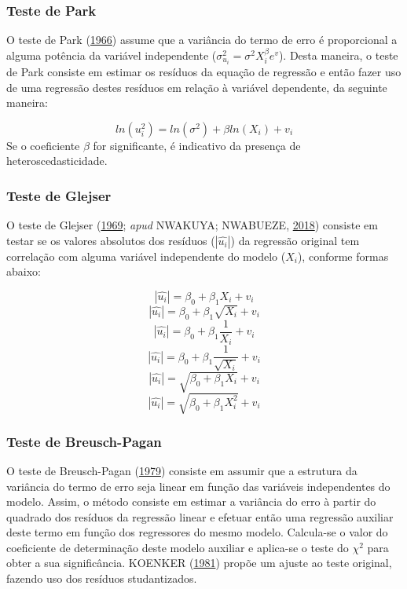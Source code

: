 \documentclass[a4paper, 12pt]{article}
\begin{document}
\hypertarget{teste-de-park}{%
\subsubsection{Teste de Park}\label{teste-de-park}}

O teste de Park (\protect\hyperlink{ref-Park}{1966}) assume que a
variância do termo de erro é proporcional a alguma potência da variável
independente (\(\sigma_{u_i}^2 = \sigma^2X_i^\beta e^v\)). Desta
maneira, o teste de Park consiste em estimar os resíduos da equação de
regressão e então fazer uso de uma regressão destes resíduos em relação
à variável dependente, da seguinte maneira:

\[ln(u_i^2) = ln(\sigma^2) + \beta ln(X_i) + v_i\] Se o coeficiente
\(\beta\) for significante, é indicativo da presença de
heteroscedasticidade.

\hypertarget{teste-de-glejser}{%
\subsubsection{Teste de Glejser}\label{teste-de-glejser}}

O teste de Glejser (\protect\hyperlink{ref-glejser}{1969}; \emph{apud}
NWAKUYA; NWABUEZE, \protect\hyperlink{ref-nigeria}{2018}) consiste em
testar se os valores absolutos dos resíduos (\(|\hat{u_i}|\)) da
regressão original tem correlação com alguma variável independente do
modelo (\(X_i\)), conforme formas abaixo:

\[|\hat{u_i}| = \beta_0 + \beta_1 X_i + v_i\]
\[|\hat{u_i}| = \beta_0 + \beta_1 \sqrt{X_i} + v_i\]
\[|\hat{u_i}| = \beta_0 + \beta_1 \frac{1}{X_i} + v_i\]
\[|\hat{u_i}| = \beta_0 + \beta_1 \frac{1}{\sqrt{X_i}} + v_i\]
\[|\hat{u_i}| = \sqrt{\beta_0 + \beta_1 X_i} + v_i\]
\[|\hat{u_i}| = \sqrt{\beta_0 + \beta_1 X_i^2} + v_i\]

\hypertarget{teste-de-breusch-pagan}{%
\subsubsection{Teste de Breusch-Pagan}\label{teste-de-breusch-pagan}}

O teste de Breusch-Pagan (\protect\hyperlink{ref-BP}{1979}) consiste em
assumir que a estrutura da variância do termo de erro seja linear em
função das variáveis independentes do modelo. Assim, o método consiste
em estimar a variância do erro à partir do quadrado dos resíduos da
regressão linear e efetuar então uma regressão auxiliar deste termo em
função dos regressores do mesmo modelo. Calcula-se o valor do
coeficiente de determinação deste modelo auxiliar e aplica-se o teste do
\(\chi^2\) para obter a sua significância. KOENKER
(\protect\hyperlink{ref-koenker1981}{1981}) propõe um ajuste ao teste
original, fazendo uso dos resíduos studantizados.
\end{document}
